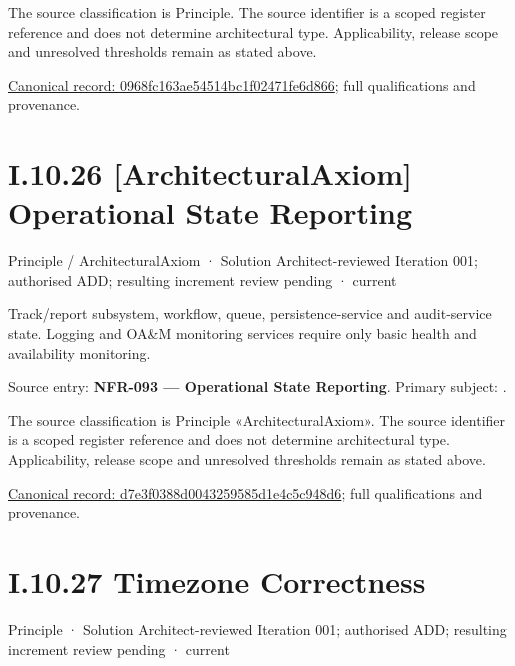 The source classification is Principle. The source identifier is a scoped register reference and does not determine architectural type. Applicability, release scope and unresolved thresholds remain as stated above.


{\footnotesize \href{../../../../../../../continuum/motivation/principle/0968fc163ae54514bc1f02471fe6d866.md}{Canonical record: 0968fc163ae54514bc1f02471fe6d866}; full qualifications and provenance.}\par
\section*{I.10.26 [ArchitecturalAxiom] Operational State Reporting}
\label{navigation:I.10.26}

\label{element:d7e3f0388d0043259585d1e4c5c948d6}
{\small Principle / ArchitecturalAxiom · Solution Architect-reviewed Iteration 001; authorised ADD; resulting increment review pending · current}\par

Track/report subsystem, workflow, queue, persistence-service and audit-service state. Logging and OA\&M monitoring services require only basic health and availability monitoring.



Source entry: \textbf{NFR-093 — Operational State Reporting}. Primary subject: \texttt{}.



The source classification is Principle «ArchitecturalAxiom». The source identifier is a scoped register reference and does not determine architectural type. Applicability, release scope and unresolved thresholds remain as stated above.


{\footnotesize \href{../../../../../../../continuum/motivation/principle/architectural-axiom/d7e3f0388d0043259585d1e4c5c948d6.md}{Canonical record: d7e3f0388d0043259585d1e4c5c948d6}; full qualifications and provenance.}\par
\section*{I.10.27 Timezone Correctness}
\label{navigation:I.10.27}

\label{element:3da1fba95a00438db09c342dfba8b693}
{\small Principle · Solution Architect-reviewed Iteration 001; authorised ADD; resulting increment review pending · current}\par

